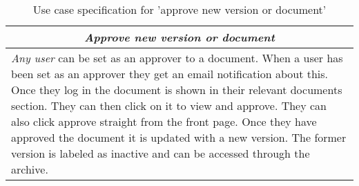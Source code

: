 \begin{table}
\centering
\begin{tabular}{p{12cm}}
\hline
\multicolumn{1}{c}{\textit{\textbf{Approve new version or document}}} \\
\hline
\textit{Any user} can be set as an approver to a document.
When a user has been set as an approver they get an email notification about this.
Once they log in the document is shown in their relevant documents section.
They can then click on it to view and approve.
They can also click approve straight from the front page.
Once they have approved the document it is updated with a new version.
The former version is labeled as inactive and can be accessed through the archive.
\\\hline
\end{tabular}
\caption{Use case specification for 'approve new version or document'}\label{tab:approve}
\end{table}
